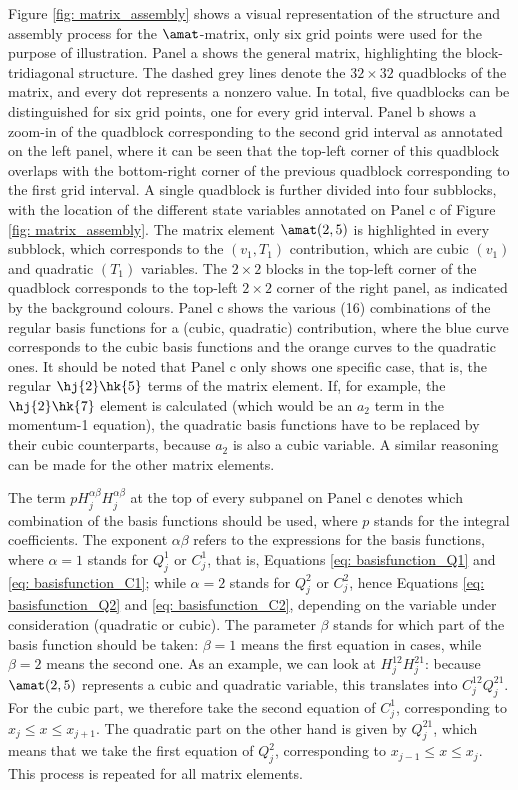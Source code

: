 Figure \ref{fig: matrix_assembly} shows a visual representation of the structure and assembly process for the $\amat$-matrix, only six grid points were used for the purpose of illustration. Panel a shows the general matrix, highlighting the block-tridiagonal structure. The dashed grey lines denote the $32 \times 32$ quadblocks of the matrix, and every dot represents a nonzero value. In total, five quadblocks can be distinguished for six grid points, one for every grid interval. Panel b shows a zoom-in of the quadblock corresponding to the second grid interval as annotated on the left panel, where it can be seen that the top-left corner of this quadblock overlaps with the bottom-right corner of the previous quadblock corresponding to the first grid interval. A single quadblock is further divided into four subblocks, with the location of the different state variables annotated on Panel c of Figure \ref{fig: matrix_assembly}.
The matrix element $\amat(2, 5)$ is highlighted in every subblock, which corresponds to the $(v_1, T_1)$ contribution, which are cubic $(v_1)$ and quadratic $(T_1)$ variables. The $2 \times 2$ blocks in the top-left corner of the quadblock corresponds to the top-left $2 \times 2$ corner of the right panel, as indicated by the background colours. Panel c shows the various (16) combinations of the regular basis functions for a (cubic, quadratic) contribution, where the blue curve corresponds to the cubic basis functions and the orange curves to the quadratic ones. It should be noted that Panel c only shows one specific case, that is, the regular $\hj{2}\hk{5}$ terms of the matrix element. If, for example, the $\hj{2}\hk{7}$ element is calculated (which would be an $a_2$ term in the momentum-1 equation), the quadratic basis functions have to be replaced by their cubic counterparts, because $a_2$ is also a cubic variable. A similar reasoning can be made for the other matrix elements.

The term $pH_j^{\alpha\beta}H_j^{\alpha\beta}$ at the top of every subpanel on Panel c denotes which combination of the basis functions should be used, where $p$ stands for the integral coefficients. The exponent $\alpha\beta$ refers to the expressions for the basis functions, where $\alpha = 1$ stands for $Q_j^1$ or $C_j^1$, that is, Equations \eqref{eq: basisfunction_Q1} and \eqref{eq: basisfunction_C1}; while $\alpha = 2$ stands for $Q_j^2$ or $C_j^2$, hence Equations \eqref{eq: basisfunction_Q2} and \eqref{eq: basisfunction_C2}, depending on the variable under consideration (quadratic or cubic). The parameter $\beta$ stands for which part of the basis function should be taken: $\beta = 1$ means the first equation in cases, while $\beta = 2$ means the second one. As an example, we can look at $H_j^{12}H_j^{21}$: because $\amat(2, 5)$ represents a cubic and quadratic variable, this translates into $C_j^{12}Q_j^{21}$. For the cubic part, we therefore take the second equation of $C_j^1$, corresponding to $x_j \leq x \leq x_{j + 1}$. The quadratic part on the other hand is given by $Q_j^{21}$, which means that we take the first equation of $Q_j^2$, corresponding to $x_{j-1} \leq x \leq x_j$. This process is repeated for all matrix elements.


